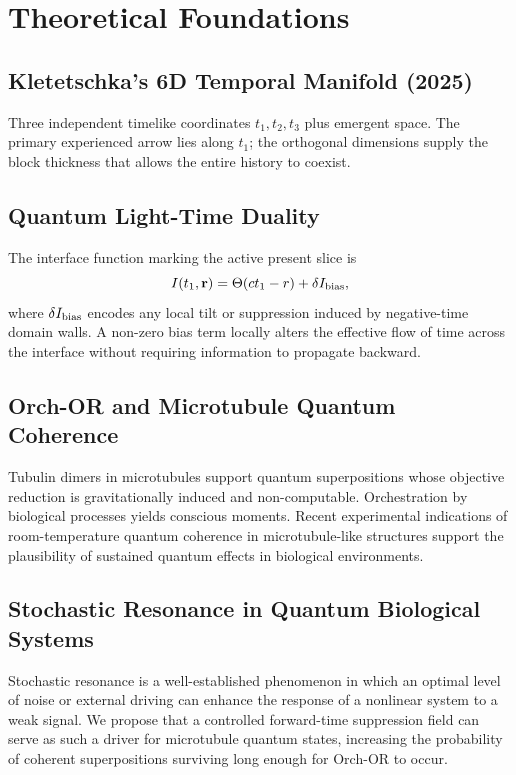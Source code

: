\documentclass[11pt,a4paper]{article}
\begin{document}
\section{Theoretical Foundations}

\subsection{Kletetschka’s 6D Temporal Manifold (2025)}
Three independent timelike coordinates $t_1, t_2, t_3$ plus emergent space. The primary experienced arrow lies along $t_1$; the orthogonal dimensions supply the block thickness that allows the entire history to coexist.

\subsection{Quantum Light-Time Duality}
The interface function marking the active present slice is
\[
I(t_1, \mathbf{r}) = \Theta(c t_1 - r) + \delta I_{\rm bias},
\]
where $\delta I_{\rm bias}$ encodes any local tilt or suppression induced by negative-time domain walls. A non-zero bias term locally alters the effective flow of time across the interface without requiring information to propagate backward.

\subsection{Orch-OR and Microtubule Quantum Coherence}
Tubulin dimers in microtubules support quantum superpositions whose objective reduction is gravitationally induced and non-computable. Orchestration by biological processes yields conscious moments. Recent experimental indications of room-temperature quantum coherence in microtubule-like structures support the plausibility of sustained quantum effects in biological environments.

\subsection{Stochastic Resonance in Quantum Biological Systems}
Stochastic resonance is a well-established phenomenon in which an optimal level of noise or external driving can enhance the response of a nonlinear system to a weak signal. We propose that a controlled forward-time suppression field can serve as such a driver for microtubule quantum states, increasing the probability of coherent superpositions surviving long enough for Orch-OR to occur.
\end{document}
